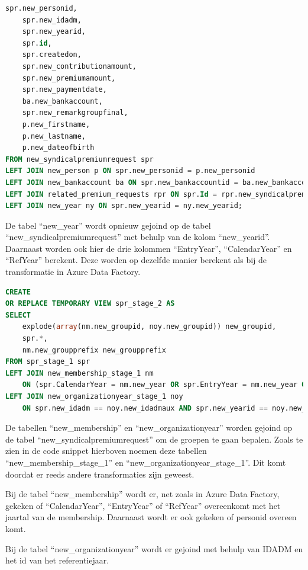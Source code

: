 \begin{lstlisting}[language=SQL, caption={Join van de tabel ``new\_year'' op de tabel ``new\_syndicalpremiumrequest'' en berekenen van de kolommen ``EntryYear'', ``CalendarYear'' en ``RefYear''.}, style=myStyle]
    spr.new_personid,
    spr.new_idadm,
    spr.new_yearid,
    spr.id,
    spr.createdon,
    spr.new_contributionamount,
    spr.new_premiumamount,
    spr.new_paymentdate,
    ba.new_bankaccount,
    spr.new_remarkgroupfinal,
    p.new_firstname,
    p.new_lastname,
    p.new_dateofbirth
FROM new_syndicalpremiumrequest spr
LEFT JOIN new_person p ON spr.new_personid = p.new_personid
LEFT JOIN new_bankaccount ba ON spr.new_bankaccountid = ba.new_bankaccountid
LEFT JOIN related_premium_requests rpr ON spr.Id = rpr.new_syndicalpremiumrequestid
LEFT JOIN new_year ny ON spr.new_yearid = ny.new_yearid;
\end{lstlisting}

De tabel ``new\_year'' wordt opnieuw gejoind op de tabel ``new\_syndicalpremiumrequest'' met behulp van de kolom ``new\_yearid''. Daarnaast worden ook hier de drie kolommen ``EntryYear'', ``CalendarYear'' en ``RefYear'' berekent. Deze worden op dezelfde manier berekent als bij de transformatie in Azure Data Factory.


\begin{lstlisting}[language=SQL, caption={Bepalen van groepen voor ``new\_syndicalpremiumrequest''.}, style=myStyle]
CREATE
OR REPLACE TEMPORARY VIEW spr_stage_2 AS
SELECT 
    explode(array(nm.new_groupid, noy.new_groupid)) new_groupid,
    spr.*,
    nm.new_groupprefix new_groupprefix
FROM spr_stage_1 spr
LEFT JOIN new_membership_stage_1 nm 
    ON (spr.CalendarYear = nm.new_year OR spr.EntryYear = nm.new_year OR RefYear == nm.new_year) AND spr.new_personid == nm.new_personid 
LEFT JOIN new_organizationyear_stage_1 noy 
    ON spr.new_idadm == noy.new_idadmaux AND spr.new_yearid == noy.new_yearid;
\end{lstlisting}

De tabellen ``new\_membership'' en ``new\_organizationyear'' worden gejoind op de tabel ``new\_syndicalpremiumrequest'' om de groepen te gaan bepalen. Zoals te zien in de code snippet hierboven noemen deze tabellen ``new\_membership\_stage\_1'' en ``new\_organizationyear\_stage\_1''. Dit komt doordat er reeds andere transformaties zijn geweest.

Bij de tabel ``new\_membership'' wordt er, net zoals in Azure Data Factory, gekeken of ``CalendarYear'', ``EntryYear'' of ``RefYear'' overeenkomt met het jaartal van de membership. Daarnaast wordt er ook gekeken of personid overeen komt. 

Bij de tabel ``new\_organizationyear'' wordt er gejoind met behulp van IDADM en het id van het referentiejaar.

